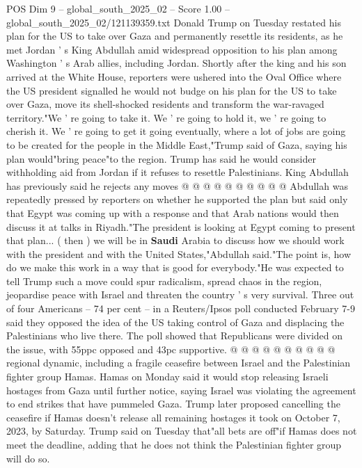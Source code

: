 \begin{textsample}{POS Dim 9 – global\_south\_2025\_02 – Score 1.00 – global\_south\_2025\_02/121139359.txt}  \label{ex:f9_pos_260}
Donald Trump on Tuesday restated his plan for the US to take over Gaza and permanently resettle its residents, as he met Jordan ' s King Abdullah amid widespread opposition to his plan among Washington ' s Arab allies, including Jordan.
Shortly after the king and his son arrived at the White House, reporters were ushered into the Oval Office where the US president signalled he would not budge on his plan for the US to take over Gaza, move its shell-shocked residents and transform the war-ravaged territory."We ' re going to take it.
We ' re going to hold it, we ' re going to cherish it.
We ' re going to get it going eventually, where a lot of jobs are going to be created for the people in the Middle East,"Trump said of Gaza, saying his plan would"bring peace"to the region.
Trump has said he would consider withholding aid from Jordan if it refuses to resettle Palestinians.
King Abdullah has previously said he rejects any moves @ @ @ @ @ @ @ @ @ @ Abdullah was repeatedly pressed by reporters on whether he supported the plan but said only that Egypt was coming up with a response and that Arab nations would then discuss it at talks in Riyadh."The president is looking at Egypt coming to present that plan... ( then ) we will be in \textbf{Saudi} Arabia to discuss how we should work with the president and with the United States,"Abdullah said."The point is, how do we make this work in a way that is good for everybody."He was expected to tell Trump such a move could spur radicalism, spread chaos in the region, jeopardise peace with Israel and threaten the country ' s very survival.
Three out of four Americans -- 74 per cent -- in a Reuters/Ipsos poll conducted February 7-9 said they opposed the idea of the US taking control of Gaza and displacing the Palestinians who live there.
The poll showed that Republicans were divided on the issue, with 55ppc opposed and 43pc supportive. @ @ @ @ @ @ @ @ @ @ regional dynamic, including a fragile ceasefire between Israel and the Palestinian fighter group Hamas.
Hamas on Monday said it would stop releasing Israeli hostages from Gaza until further notice, saying Israel was violating the agreement to end strikes that have pummeled Gaza.
Trump later proposed cancelling the ceasefire if Hamas doesn't release all remaining hostages it took on October 7, 2023, by Saturday.
Trump said on Tuesday that"all bets are off"if Hamas does not meet the deadline, adding that he does not think the Palestinian fighter group will do so.

\end{textsample}
